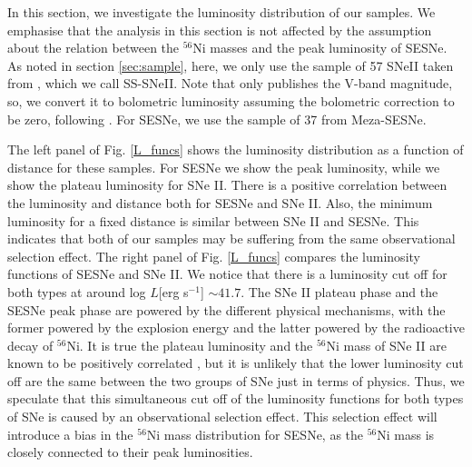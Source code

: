 \documentclass[twocolumn, linenumbers]{aastex62}
\begin{document}
In this section, we investigate the luminosity distribution of our samples. We emphasise that the analysis in this section is not affected by the assumption about the relation between the $^{56}$Ni masses and the peak luminosity of SESNe.
As noted in section \ref{sec:sample}, here, we only use the sample of 57 SNeII taken from \citet{2003ApJ...582..905H, 2017ApJ...841..127M, 2015ApJ...806..225P}, which we call SS-SNeII. Note that \citet{2003ApJ...582..905H} only publishes the V-band magnitude, so, we convert it to bolometric luminosity assuming the bolometric correction to be zero, following \citet{2019ApJ...879....3G}. For SESNe, we use the sample of 37 from Meza-SESNe.

The left panel of Fig. \ref{L_funcs} shows the luminosity distribution as a function of distance for these samples. For SESNe we show the peak luminosity, while we show the plateau luminosity for SNe II. There is a positive correlation between the luminosity and distance both for SESNe and SNe II. Also, the minimum luminosity for a fixed distance is similar between SNe II and SESNe. This indicates that both of our samples may be suffering from the same observational selection effect.
The right panel of Fig. \ref{L_funcs} compares the luminosity functions of SESNe and SNe II. We notice that there is a luminosity cut off for both types at around log $L$[erg s$^{-1}$] $\sim 41.7$. The SNe II plateau phase and the SESNe peak phase are powered by the different physical mechanisms, with the former powered by the explosion energy and the latter powered by the radioactive decay of $^{56}$Ni. It is true the plateau luminosity and the $^{56}$Ni mass of SNe II are known to be positively correlated \citep{2015ApJ...806..225P}, but it is unlikely that the lower luminosity cut off are the same between the two groups of SNe just in terms of physics. Thus, we speculate that this simultaneous cut off of the luminosity functions for both types of SNe is caused by an observational selection effect.
This selection effect will introduce a bias in the $^{56}$Ni mass distribution for SESNe, as the $^{56}$Ni mass is closely connected to their peak luminosities.

\end{document}
